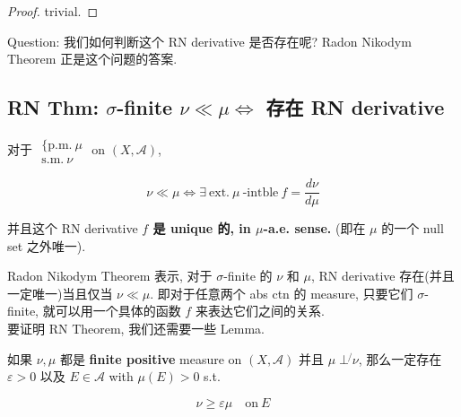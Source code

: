\begin{proof}

trivial.

\end{proof}

Question: 我们如何判断这个 RN derivative 是否存在呢? Radon Nikodym Theorem 正是这个问题的答案.

\subsection{\texorpdfstring{RN Thm: \(\sigma\)-finite \(\nu \ll \mu\Leftrightarrow\) 存在 RN derivative}{RN Thm: \textbackslash sigma-finite \textbackslash nu \textbackslash ll \textbackslash mu\textbackslash Leftrightarrow 存在 RN derivative}}

\begin{theorem}{}

对于  \(\begin{matrix}
{\{\text{p.m.}\ \mu} \\
{\text{s.m.}\ \nu}
\end{matrix}\) on \((X,\mathcal{A})\),

\[\nu \ll \mu\Leftrightarrow\exists\ \text{ext.}\ \mu\ \text{-intble}\ f = \frac{d\nu}{d\mu}\]

并且这个 RN derivative \textbf{\(f\) 是 \textbf{unique 的, in \(\mu\)-a.e. sense.}} (即在 \(\mu\) 的一个 null set 之外唯一).

\end{theorem}

Radon Nikodym Theorem 表示, 对于 \(\sigma\)-finite 的 \(\nu\) 和 \(\mu\), RN derivative 存在(并且一定唯一)当且仅当 \(\nu \ll \mu\). 即对于任意两个 abs ctn 的 measure, 只要它们 \(\sigma\)-finite, 就可以用一个具体的函数 \(f\) 来表达它们之间的关系.\\
要证明 RN Theorem, 我们还需要一些 Lemma.

\begin{lemma}

如果 \(\nu,\mu\) 都是 \textbf{finite positive} measure on \((X,\mathcal{A})\) 并且 \(\mu\operatorname{\perp\not{}}\nu\), 那么一定存在 \(\varepsilon > 0\) 以及 \(E \in \mathcal{A}\) with \(\mu(E) > 0\) s.t.

\[\nu \geq \varepsilon\mu\quad\text{on}\ E\]

\end{lemma}

